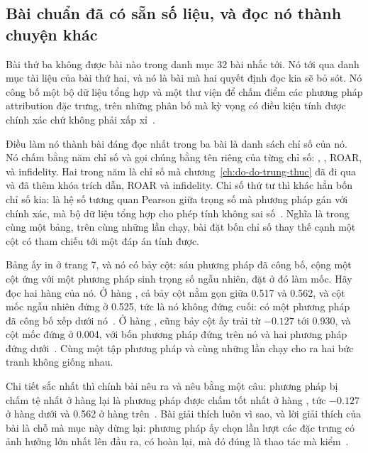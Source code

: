 \subsection*{Bài chuẩn đã có sẵn số liệu, và đọc nó thành chuyện khác}

%
Bài thứ ba không được bài nào trong danh mục 32 bài nhắc tới. Nó tới qua danh mục
tài liệu của bài thứ hai, và nó là bài mà hai quyết định đọc kia sẽ bỏ sót. Nó
công bố một bộ dữ liệu tổng hợp và một thư viện để chấm điểm các phương pháp
attribution đặc trưng, trên những phân bố mà kỳ vọng có điều kiện tính được chính
xác chứ không phải xấp xỉ~\autocite{mxaibench}.

Điều làm nó thành bài đáng đọc nhất trong ba bài là danh sách chỉ số của nó. Nó
chấm bằng năm chỉ số và gọi chúng bằng tên riêng của từng chỉ số:
, , ROAR,  và infidelity.
Hai trong năm là chỉ số mà chương~\ref{ch:do-do-trung-thuc} đã đi qua và đã thêm
khóa trích dẫn, ROAR và infidelity. Chỉ số thứ tư thì khác hẳn bốn chỉ số kia:
 là hệ số tương quan Pearson giữa trọng số mà phương pháp gán
với  chính xác, mà bộ dữ liệu tổng hợp cho
phép tính không sai số~\autocite{mxaibench}. Nghĩa là trong cùng một bảng, trên
cùng những lần chạy, bài đặt bốn chỉ số thay thế cạnh một cột có tham chiếu tới
một đáp án tính được.

%
Bảng ấy in ở trang 7, và nó có bảy cột: sáu phương pháp đã công bố, cộng một cột
ứng với một phương pháp sinh trọng số ngẫu nhiên, đặt ở đó làm mốc. Hãy đọc hai
hàng của nó. Ở hàng , cả bảy cột nằm gọn giữa 0.517 và 0.562,
và cột mốc ngẫu nhiên đứng ở 0.525, tức là nó không đứng cuối: có một phương pháp
đã công bố xếp dưới nó~\autocite{mxaibench}. Ở hàng , cũng bảy
cột ấy trải từ $-0.127$ tới 0.930, và cột mốc đứng ở 0.004, với bốn phương pháp
đứng trên nó và hai phương pháp đứng dưới~\autocite{mxaibench}. Cùng một tập
phương pháp và cùng những lần chạy cho ra hai bức tranh không giống nhau.

Chi tiết sắc nhất thì chính bài nêu ra và nêu bằng một câu: phương pháp bị chấm
tệ nhất ở hàng  lại là phương pháp được chấm tốt nhất ở hàng
, tức $-0.127$ ở hàng dưới và 0.562 ở hàng
trên~\autocite{mxaibench}. Bài giải thích luôn vì sao, và lời giải thích của bài
là chỗ mà mục này dừng lại: phương pháp ấy chọn lần lượt các đặc trưng có ảnh
hưởng lớn nhất lên đầu ra, có hoàn lại, mà đó đúng là thao tác mà
 kiểm~\autocite{mxaibench}.

